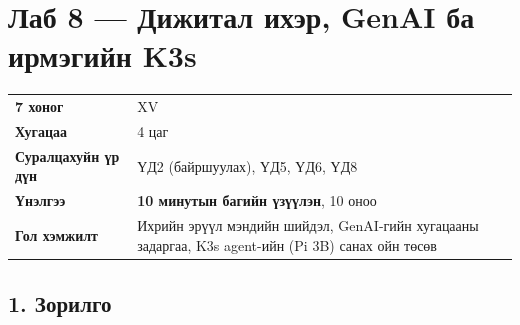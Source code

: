 \chapter{Лаб 8 — Дижитал ихэр, GenAI ба ирмэгийн K3s}

\begingroup\scriptsize\begin{longtable}[]{@{}ll@{}}
\toprule
\endhead
\begin{minipage}[t]{0.47\columnwidth}\raggedright
\textbf{7 хоног}\strut
\end{minipage} & \begin{minipage}[t]{0.47\columnwidth}\raggedright
XV\strut
\end{minipage}\tabularnewline
\begin{minipage}[t]{0.47\columnwidth}\raggedright
\textbf{Хугацаа}\strut
\end{minipage} & \begin{minipage}[t]{0.47\columnwidth}\raggedright
4 цаг\strut
\end{minipage}\tabularnewline
\begin{minipage}[t]{0.47\columnwidth}\raggedright
\textbf{Суралцахуйн үр дүн}\strut
\end{minipage} & \begin{minipage}[t]{0.47\columnwidth}\raggedright
ҮД2 (байршуулах), ҮД5, ҮД6, ҮД8\strut
\end{minipage}\tabularnewline
\begin{minipage}[t]{0.47\columnwidth}\raggedright
\textbf{Үнэлгээ}\strut
\end{minipage} & \begin{minipage}[t]{0.47\columnwidth}\raggedright
\textbf{10 минутын багийн үзүүлэн}, 10 оноо\strut
\end{minipage}\tabularnewline
\begin{minipage}[t]{0.47\columnwidth}\raggedright
\textbf{Гол хэмжилт}\strut
\end{minipage} & \begin{minipage}[t]{0.47\columnwidth}\raggedright
Ихрийн эрүүл мэндийн шийдэл, GenAI-гийн хугацааны задаргаа, K3s agent-ийн (Pi 3B) санах ойн төсөв\strut
\end{minipage}\tabularnewline
\bottomrule
\end{longtable}\endgroup

\hypertarget{ux437ux43eux440ux438ux43bux433ux43e}{%
\section{1. Зорилго}\label{ux437ux43eux440ux438ux43bux433ux43e}}

